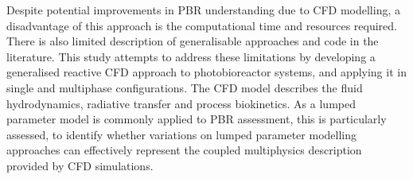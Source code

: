 \skippingparagraph
Despite potential improvements in PBR understanding due to CFD modelling, a disadvantage of this approach is the computational time and resources required. There is also limited description of generalisable approaches and code in the literature. This study attempts to address these limitations by developing a generalised reactive CFD approach to photobioreactor systems, and applying it in single and multiphase configurations. The CFD model describes the fluid hydrodynamics, radiative transfer and process biokinetics. As a lumped parameter model is commonly applied to PBR assessment, this is particularly assessed, to identify whether variations on lumped parameter modelling approaches can effectively represent the coupled multiphysics description provided by CFD simulations.
\newpage




